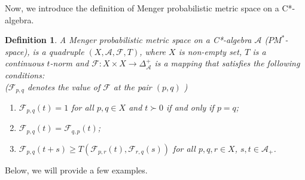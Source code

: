 \documentclass{amsart}%
\theoremstyle{plain}
\newtheorem{definition}{Definition}
\numberwithin{equation}{section}
\begin{document}
Now, we introduce the definition of Menger probabilistic metric space on a C*-algebra. 
\begin{definition}\label{PM-def}
	A Menger probabilistic metric space on a C*-algebra $\mathcal{A}$ ($PM^*$-space), is a quadruple $(X,\mathcal{A},\mathcal{F},T)$, where $X$ is non-empty set, $T$ is a continuous $t$-norm and $\mathcal{F}:X\times X\to \Delta^+_{\mathcal{A}}$ is a mapping that satisfies the following conditions:\\
	($\mathcal{F}_{p,q}$ denotes the value of $\mathcal{F}$ at the pair $(p,q)$ )
	\begin{enumerate}
		\item $\mathcal{F}_{p,q}(t)=1$ for all $p,q\in X$ and $t\succ0$ if and only if $p=q$;
		\item $\mathcal{F}_{p,q}(t)=\mathcal{F}_{q,p}(t)$;
		\item $\mathcal{F}_{p,q}(t+s)\geq T\left(\mathcal{F}_{p,r}(t), \mathcal{F}_{r,q}(s)\right)$ for all $p,q,r\in X$, $s,t \in \mathcal{A}_+$.
	\end{enumerate}
\end{definition}
Below, we will provide a few examples.
\end{document}
